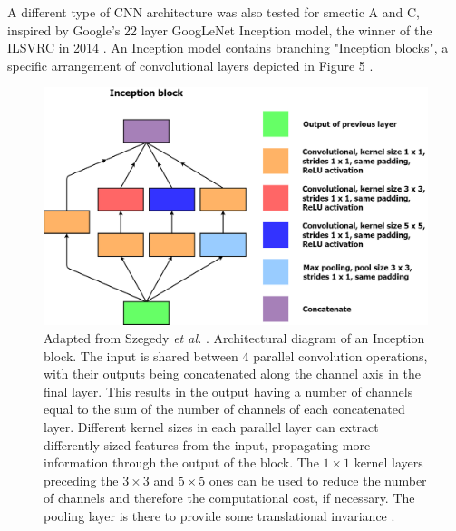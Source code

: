 \documentclass[12pt]{article}
\begin{document}
A different type of CNN architecture was also tested for smectic A and C, inspired by Google's 22 layer GoogLeNet Inception model, the winner of the ILSVRC in 2014 \cite{ILSVRC15}. An Inception model contains branching "Inception blocks", a specific arrangement of convolutional layers depicted in Figure 5 \cite{Szegedy2015}.  
\begin{figure}[!ht]
\centering
\includegraphics[width=5in]{images/inception_block.png}
\caption{Adapted from Szegedy \textit{et al.} \cite{Szegedy2015}. Architectural diagram of an Inception block. The input is shared between 4 parallel convolution operations, with their outputs being concatenated along the channel axis in the final layer. This results in the output having a number of channels equal to the sum of the number of channels of each concatenated layer. Different kernel sizes in each parallel layer can extract differently sized features from the input, propagating more information through the output of the block. The $1 \times 1$ kernel layers preceding the $3 \times 3$ and $5 \times 5$ ones can be used to reduce the number of channels and therefore the computational cost, if necessary. The pooling layer is there to provide some translational invariance \cite{Szegedy2015}.}
\end{figure}
\end{document}

